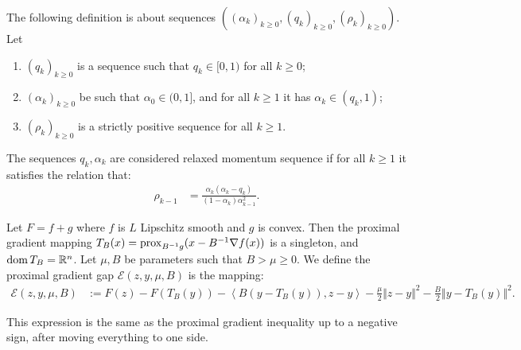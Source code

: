 \documentclass[12pt]{article}
\begin{document}
    \begin{definition}\label{def:rlx-momentum-seq}
        The following definition is about sequences $((\alpha_k)_{k \ge 0}, (q_k)_{k \ge 0}, (\rho_k)_{k \ge 0})$. 
        Let 
        \begin{enumerate}[nosep]
            \item $(q_k)_{k \ge 0}$ is a sequence such that $q_k \in [0, 1)$ for all $k \ge 0$;
            \item $(\alpha_k)_{k \ge 0}$ be such that $\alpha_0 \in (0, 1]$, and for all $k \ge 1$ it has $\alpha_k \in (q_k, 1)$;
            \item $(\rho_k)_{k \ge 0}$ is a strictly positive sequence for all $k \ge 1$. 
        \end{enumerate}
        The sequences $q_k, \alpha_k$ are considered relaxed momentum sequence if for all $k \ge 1$ it satisfies the relation that: 
        \begin{align*}
            \rho_{k - 1} &= \frac{\alpha_k(\alpha_k - q_k)}{(1 - \alpha_{k})\alpha_{k - 1}^2}. 
        \end{align*}
    \end{definition}
    \begin{definition}\label{def:pg-gap}
        Let $F = f + g$ where $f$ is $L$ Lipschitz smooth and $g$ is convex. 
        Then the proximal gradient mapping $T_B(x) = \operatorname{prox}_{B^{-1}g}(x -  B^{-1}\nabla f(x))$ is a singleton, and $\operatorname{dom} T_B = \mathbb R^n$. 
        Let $\mu, B$ be parameters such that $B > \mu \ge 0$. 
        We define the proximal gradient gap $\mathcal E(z, y, \mu, B)$ is the mapping: 
        \begin{align*}
            \mathcal E(z, y, \mu, B) &:= 
            F(z) - F(T_B(y)) 
            - \left\langle B(y - T_B(y)), z - y\right\rangle
            - \frac{\mu}{2}\Vert z - y\Vert^2
            - \frac{B}{2}\Vert y - T_B(y)\Vert^2. 
        \end{align*}
    \end{definition}
    \begin{remark}
        This expression is the same as the proximal gradient inequality up to a negative sign, after moving everything to one side. 
    \end{remark}
    
\end{document}

